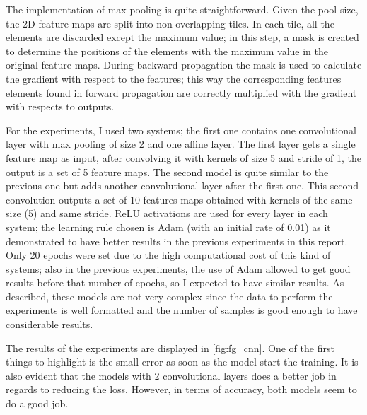 \documentclass{article}
\begin{document}
The implementation of max pooling is quite straightforward. Given the pool size, the 2D feature maps are split into non-overlapping tiles. In each tile, all the elements are discarded except the maximum value; in this step, a mask is created to determine the positions of the elements with the maximum value in the original feature maps. During backward propagation the mask is used to calculate the gradient with respect to the features; this way the corresponding features elements found in forward propagation are correctly multiplied with the gradient with respects to outputs.

For the experiments, I used two systems; the first one contains one convolutional layer with max pooling of size 2 and one affine layer. The first layer gets a single feature map as input, after convolving it with kernels of size 5 and stride of 1, the output is a set of 5 feature maps. The second model is quite similar to the previous one but adds another convolutional layer after the first one. This second convolution outputs a set of 10 features maps obtained with kernels of the same size (5) and same stride. ReLU activations are used for every layer in each system; the learning rule chosen is Adam (with an initial rate of 0.01) as it demonstrated to have better results in the previous experiments in this report. Only 20 epochs were set due to the high computational cost of this kind of systems; also in the previous experiments, the use of Adam allowed to get good results before that number of epochs, so I expected to have similar results. As described, these models are not very complex since the data to perform the experiments is well formatted and the number of samples is good enough to have considerable results.

The results of the experiments are displayed in \ref{fig:fg_cnn}. One of the first things to highlight is the small error as soon as the model start the training. It is also evident that the models with 2 convolutional layers does a better job in regards to reducing the loss. However, in terms of accuracy, both models seem to do a good job.
\end{document}
